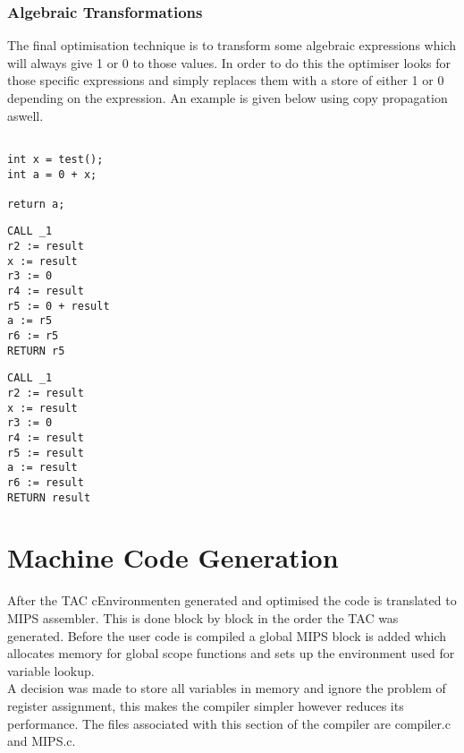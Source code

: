 \documentclass{article}
\begin{document}
\subsubsection{Algebraic Transformations}

The final optimisation technique is to transform some algebraic expressions
which will always give 1 or 0 to those values. In order to do this the optimiser
looks for those specific expressions and simply replaces them with a store of either
1 or 0 depending on the expression. An example is given below using copy propagation
aswell.

\begin{minipage}{0.3\textwidth}
\begin{lstlisting}

int x = test();
int a = 0 + x;

return a;
\end{lstlisting}
\end{minipage}%
\begin{minipage}{0.3\textwidth}
\begin{lstlisting}
CALL _1
r2 := result
x := result
r3 := 0
r4 := result
r5 := 0 + result
a := r5
r6 := r5
RETURN r5
\end{lstlisting}
\end{minipage}%
\begin{minipage}{0.3\textwidth}
\begin{lstlisting}
CALL _1
r2 := result
x := result
r3 := 0
r4 := result
r5 := result
a := result
r6 := result
RETURN result
\end{lstlisting}
\end{minipage}%

\section{Machine Code Generation}

After the TAC cEnvironmenten generated and optimised the code is translated to MIPS
assembler. This is done block by block in the order the TAC was generated.
Before the user code is compiled a global MIPS block is added which allocates memory
for global scope functions and sets up the environment used for variable lookup.\\
A decision was made to store all variables in memory and ignore the problem of register
assignment, this makes the compiler simpler however reduces its performance. The files
associated with this section of the compiler are compiler.c and MIPS.c.
\end{document}
